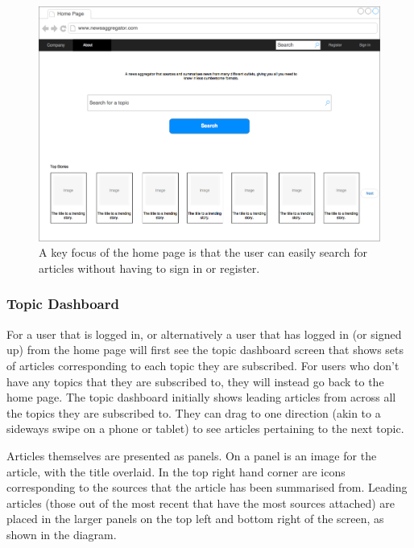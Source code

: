 \documentclass[12pt]{article}
\begin{document}
\begin{figure}[ht!]
  \centering
    \includegraphics[scale=0.3]{HomePage.png}
   \caption[A wireframe of the Home Screen]{A key focus of the home page is that the user can easily search for articles without having to sign in or register.}
   \label{homePage}
\end{figure}

\subsubsection{Topic Dashboard}

For a user that is logged in, or alternatively a user that has logged in (or signed up) from the home page will first see the topic dashboard screen that shows sets of articles corresponding to each topic they are subscribed. For users who don't have any topics that they are subscribed to, they will instead go back to the home page. The topic dashboard initially shows leading articles from across all the topics they are subscribed to. They can drag to one direction (akin to a sideways swipe on a phone or tablet) to see articles pertaining to the next topic. 

Articles themselves are presented as panels. On a panel is an image for the article, with the title overlaid. In the top right hand corner are icons corresponding to the sources that the article has been summarised from. Leading articles (those out of the most recent that have the most sources attached) are placed in the larger panels on the top left and bottom right of the screen, as shown in the diagram.
\end{document}
